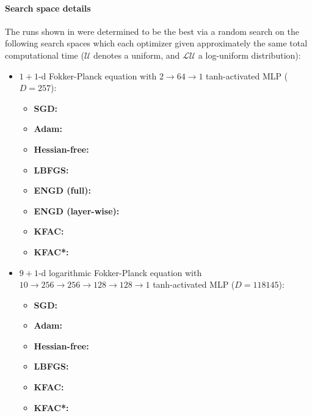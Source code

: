 \paragraph{Search space details} The runs shown in  were determined to be the best via a random search on the following search spaces which each optimizer given approximately the same total computational time ($\mathcal{U}$ denotes a uniform, and $\mathcal{LU}$ a log-uniform distribution):
\begin{itemize}

\item $1+1$-d Fokker-Planck equation with $2 \to 64 \to 1$ tanh-activated MLP ($D=\num{257}$):
  \begin{itemize}
    \def\pathToRuns{kfac_pinns_exp/exp46_fokker_planck1d_isotropic_gaussian_random/tex}
  \item \textbf{SGD:} 
  \item \textbf{Adam:} 
  \item \textbf{Hessian-free:} 
  \item \textbf{LBFGS:} 
  \item \textbf{ENGD (full):} 
  \item \textbf{ENGD (layer-wise):} 
  \item \textbf{KFAC:} 
  \item \textbf{KFAC*:} 
  \end{itemize}
\item $9+1$-d logarithmic Fokker-Planck equation with $10 \to 256 \to 256 \to 128 \to 128 \to 1$ tanh-activated MLP ($D=\num{118145}$):
  \begin{itemize}
    \def\pathToRuns{kfac_pinns_exp/exp43_log_fokker_planck9d_isotropic_gaussian_random/tex}
  \item \textbf{SGD:} 
  \item \textbf{Adam:} 
  \item \textbf{Hessian-free:} 
  \item \textbf{LBFGS:} 
  \item \textbf{KFAC:} 
  \item \textbf{KFAC*:} 
  \end{itemize}


\end{itemize}
